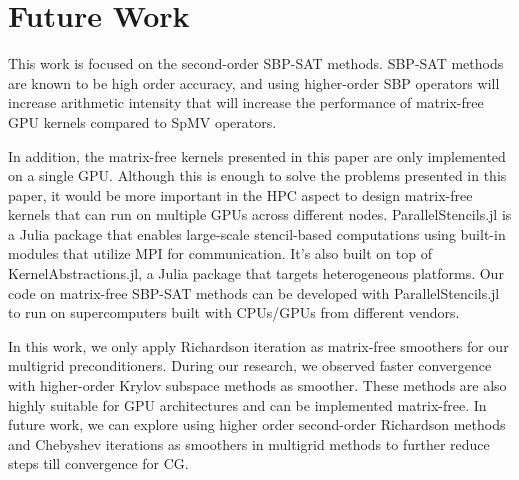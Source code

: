 \section{Future Work}
This work is focused on the second-order SBP-SAT methods. SBP-SAT methods are known to be high order accuracy, and using higher-order SBP operators will increase arithmetic intensity that will increase the performance of matrix-free GPU kernels compared to SpMV operators.

In addition, the matrix-free kernels presented in this paper are only implemented on a single GPU. 
Although this is enough to solve the problems presented in this paper, it would be more important in the HPC aspect to design matrix-free kernels that can run on multiple GPUs across different nodes.
ParallelStencils.jl is a Julia package that enables large-scale stencil-based computations using built-in modules that utilize MPI for communication.
It's also built on top of KernelAbstractions.jl, a Julia package that targets heterogeneous platforms.
Our code on matrix-free SBP-SAT methods can be developed with ParallelStencils.jl to run on supercomputers built with CPUs/GPUs from different vendors.

In this work, we only apply Richardson iteration as matrix-free smoothers for our multigrid preconditioners. During our research, we observed faster convergence with higher-order Krylov subspace methods as smoother. These methods are also highly suitable for GPU architectures and can be implemented matrix-free.
In future work, we can explore using higher order second-order Richardson methods and Chebyshev iterations as smoothers in multigrid methods to further reduce steps till convergence for CG.